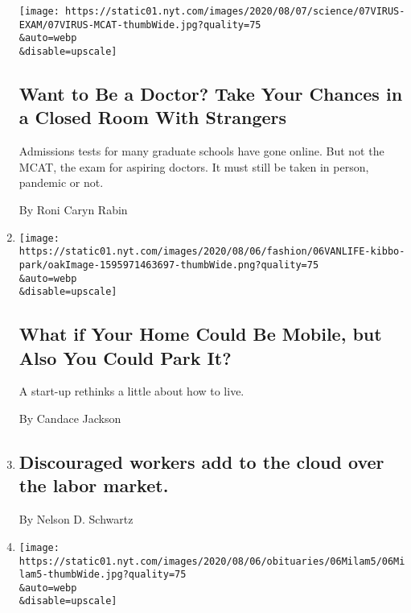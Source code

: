 \begin{enumerate}
  \texttt{[image: https://static01.nyt.com/images/2020/08/07/science/07VIRUS-EXAM/07VIRUS-MCAT-thumbWide.jpg?quality=75\\\&auto=webp\\\&disable=upscale]}

  \hypertarget{want-to-be-a-doctor-take-your-chances-in-a-closed-room-with-strangers}{%
  \subsection{Want to Be a Doctor? Take Your Chances in a Closed Room
  With
  Strangers}\label{want-to-be-a-doctor-take-your-chances-in-a-closed-room-with-strangers}}

  Admissions tests for many graduate schools have gone online. But not
  the MCAT, the exam for aspiring doctors. It must still be taken in
  person, pandemic or not.

  By Roni Caryn Rabin
\item
  \href{/2020/08/07/style/kibbo-van-life-startup.html}{}

  \texttt{[image: https://static01.nyt.com/images/2020/08/06/fashion/06VANLIFE-kibbo-park/oakImage-1595971463697-thumbWide.png?quality=75\\\&auto=webp\\\&disable=upscale]}

  \hypertarget{what-if-your-home-could-be-mobile-but-also-you-could-park-it}{%
  \subsection{What if Your Home Could Be Mobile, but Also You Could Park
  It?}\label{what-if-your-home-could-be-mobile-but-also-you-could-park-it}}

  A start-up rethinks a little about how to live.

  By Candace Jackson
\item
  \href{/2020/08/07/business/discouraged-workers-add-to-the-cloud-over-the-labor-market.html}{}

  \hypertarget{discouraged-workers-add-to-the-cloud-over-the-labor-market}{%
  \subsection{Discouraged workers add to the cloud over the labor
  market.}\label{discouraged-workers-add-to-the-cloud-over-the-labor-market}}

  By Nelson D. Schwartz
\item
  \href{/2020/08/07/business/media/lorenzo-milam-dead.html}{}

  \texttt{[image: https://static01.nyt.com/images/2020/08/06/obituaries/06Milam5/06Milam5-thumbWide.jpg?quality=75\\\&auto=webp\\\&disable=upscale]}


\end{enumerate}
